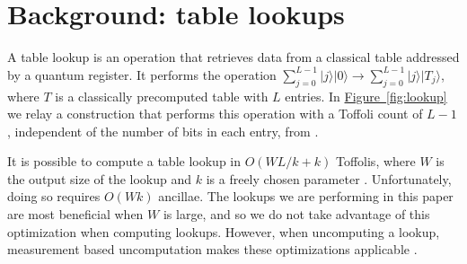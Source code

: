 \documentclass[onecolumn,unpublished]{quantumarticle}
\theoremstyle{definition}
\theoremstyle{definition}
\theoremstyle{definition}
\newcommand{\fig}[1]{\hyperref[fig:#1]{Figure~\ref*{fig:#1}}}
\begin{document}
\section{Background: table lookups}
\label{sec:background}

A table lookup is an operation that retrieves data from a classical table addressed by a quantum register.
It performs the operation $\sum_{j=0}^{L-1} |j\rangle|0\rangle \rightarrow \sum_{j=0}^{L-1} |j\rangle|T_j\rangle$, where $T$ is a classically precomputed table with $L$ entries.
In \fig{lookup} we relay a construction that performs this operation with a Toffoli count of $L-1$, independent of the number of bits in each entry, from \cite{babbush2018}.

It is possible to compute a table lookup in $O(WL/k + k)$ Toffolis, where $W$ is the output size of the lookup and $k$ is a freely chosen parameter \cite{low2018qrom}.
Unfortunately, doing so requires $O(Wk)$ ancillae.
The lookups we are performing in this paper are most beneficial when $W$ is large, and so we do not take advantage of this optimization when computing lookups.
However, when uncomputing a lookup, measurement based uncomputation makes these optimizations applicable \cite{berry2019qubitization}.
\end{document}
